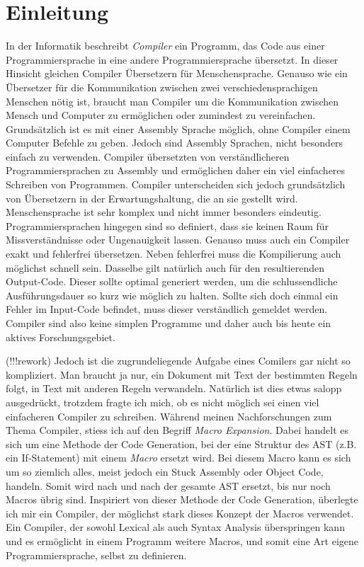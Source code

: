 \chapter{Einleitung}
In der Informatik beschreibt \textit{Compiler} ein Programm, das Code aus einer Programmiersprache in eine andere Programmiersprache übersetzt. In dieser Hinsicht gleichen Compiler Übersetzern für Menschensprache.
Genauso wie ein Übersetzer für die Kommunikation zwischen zwei verschiedensprachigen Menschen nötig ist, braucht man Compiler um die Kommunikation zwischen Mensch und Computer zu ermöglichen oder zumindest zu vereinfachen.
Grundsätzlich ist es mit einer Assembly Sprache möglich, ohne Compiler einem Computer Befehle zu geben. Jedoch sind Assembly Sprachen, nicht besonders einfach zu verwenden.
Compiler übersetzten von verständlicheren Programmiersprachen zu Assembly und ermöglichen daher ein viel einfacheres Schreiben von Programmen.
Compiler unterscheiden sich jedoch grundsätzlich von Übersetzern in der Erwartungshaltung, die an sie gestellt wird. Menschensprache ist sehr komplex und nicht immer besonders eindeutig. 
Programmiersprachen hingegen sind so definiert, dass sie keinen Raum für Missverständnisse oder Ungenauigkeit lassen. Genauso muss auch ein Compiler exakt und fehlerfrei übersetzen.
Neben fehlerfrei muss die Kompilierung auch möglichst schnell sein. Dasselbe gilt natürlich auch für den resultierenden Output-Code. Dieser sollte optimal generiert werden, um die schlussendliche
Ausführungsdauer so kurz wie möglich zu halten. Sollte sich doch einmal ein Fehler im Input-Code befindet, muss dieser verständlich gemeldet werden. Compiler sind also keine simplen Programme und daher auch bis heute
ein aktives Forschungsgebiet.

(!!!rework)
Jedoch ist die zugrundeliegende Aufgabe eines Comilers gar nicht so kompliziert.
Man braucht ja nur, ein Dokument mit Text der bestimmten Regeln folgt, in Text mit anderen Regeln verwandeln. Natürlich ist dies etwas salopp ausgedrückt, trotzdem fragte ich mich,
ob es nicht möglich sei einen viel einfacheren Compiler zu schreiben. Während meinen Nachforschungen zum Thema Compiler, stiess ich auf den Begriff \textit{Macro Expansion}.
Dabei handelt es sich um eine Methode der Code Generation, bei der eine Struktur des AST (z.B. ein If-Statement) mit einem \textit{Macro} ersetzt wird. Bei diesem Macro kann es sich um so ziemlich alles,
meist jedoch ein Stuck Assembly oder Object Code, handeln. Somit wird nach und nach der gesamte AST ersetzt, bis nur noch Macros übrig sind. Inspiriert von dieser Methode der Code Generation,
überlegte ich mir ein Compiler, der möglichst stark dieses Konzept der Macros verwendet. Ein Compiler, der sowohl Lexical als auch Syntax Analysis überspringen kann und es ermöglicht in einem Programm weitere Macros,
und somit eine Art eigene Programmiersprache, selbst zu definieren.
